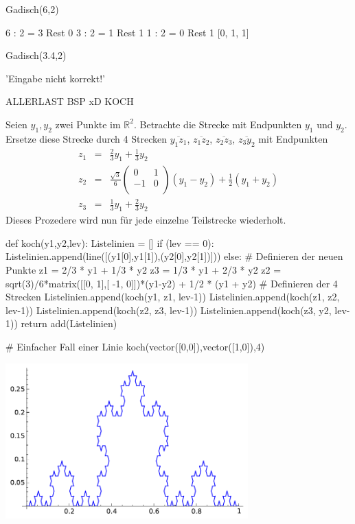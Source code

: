 \documentclass[fontsize=12pt,paper=a4,twoside,bibtotoc,idxtotoc,
liststotoc,pagesize,BCOR1.2cm,DIV15,chapterprefix,pagesize=pdftex]{scrbook}
\theoremstyle{plain}
\theoremstyle{definition}
\theoremstyle{remark}
\begin{document}
\begin{sagein}
Gadisch(6,2)
\end{sagein}
\begin{sage}
6 : 2 = 3 Rest 0
3 : 2 = 1 Rest 1
1 : 2 = 0 Rest 1
[0, 1, 1]
\end{sage}

\begin{sagein}
Gadisch(3.4,2)
\end{sagein}
\begin{sage}
'Eingabe nicht korrekt!'
\end{sage}

ALLERLAST BSP xD
KOCH


 Seien $y_1,y_2$ zwei Punkte im $\mathbb{R}^2$. 
 Betrachte die Strecke mit Endpunkten $y_1$ und $y_2$.  
 Ersetze  diese Strecke durch 4 Strecken 
$\overline{y_1 z_1}$, $\overline{z_1 z_2}$, $\overline{z_2 z_3}$,
$\overline{z_3 y_2}$ mit Endpunkten 
\begin{eqnarray*}
 z_1 &=&\frac23 y_1 + \frac13 y_2\\[0.5cm]
 z_2 &=& \frac{\sqrt{3}}{6} \left( \begin{array}{cc}
 0 & 1 \\ -1 & 0 \\
 \end{array} \right)
 (y_1 - y_2) + \frac12 (y_1 + y_2)\\[0.5cm]
 z_3 &=&\frac13 y_1 + \frac23 y_2
\end{eqnarray*}
 Dieses Prozedere wird nun für jede einzelne Teilstrecke wiederholt.


\begin{sagein}
def koch(y1,y2,lev):
    Listelinien = []
    if (lev == 0):
        Listelinien.append(line([(y1[0],y1[1]),(y2[0],y2[1])]))
    else:
        # Definieren der neuen Punkte 
        z1 = 2/3 * y1 + 1/3 * y2
        z3 = 1/3 * y1 + 2/3 * y2
        z2 = sqrt(3)/6*matrix([[0, 1],[ -1, 0]])*(y1-y2) + 1/2 * (y1 + y2)
        # Definieren der 4 Strecken
        Listelinien.append(koch(y1, z1, lev-1))
        Listelinien.append(koch(z1, z2, lev-1))
        Listelinien.append(koch(z2, z3, lev-1))
        Listelinien.append(koch(z3, y2, lev-1))
    return add(Listelinien)
\end{sagein}

\begin{sagein}
# Einfacher Fall einer Linie 
koch(vector([0,0]),vector([1,0]),4)
\end{sagein}
\begin{center}
\includegraphics[width=0.7\textwidth]{koch.pdf} 
\end{center}
\end{document}
